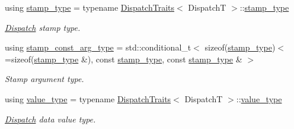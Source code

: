 \begin{DoxyCompactItemize}
\item 
\mbox{\label{classflow_1_1_dispatch_queue_a7908f3d78b7f1767462244b94434d748}} 
using \hyperlink{classflow_1_1_dispatch_queue_a7908f3d78b7f1767462244b94434d748}{stamp\+\_\+type} = typename \hyperlink{structflow_1_1_dispatch_traits}{Dispatch\+Traits}$<$ DispatchT $>$\+::\hyperlink{classflow_1_1_dispatch_queue_a7908f3d78b7f1767462244b94434d748}{stamp\+\_\+type}
\begin{DoxyCompactList}\small\item\em \hyperlink{classflow_1_1_dispatch}{Dispatch} stamp type. \end{DoxyCompactList}\item 
\mbox{\label{classflow_1_1_dispatch_queue_affc83531dc53ee147899a33e82a6cbf0}} 
using \hyperlink{classflow_1_1_dispatch_queue_affc83531dc53ee147899a33e82a6cbf0}{stamp\+\_\+const\+\_\+arg\+\_\+type} = std\+::conditional\+\_\+t$<$ sizeof(\hyperlink{classflow_1_1_dispatch_queue_a7908f3d78b7f1767462244b94434d748}{stamp\+\_\+type})$<$=sizeof(\hyperlink{classflow_1_1_dispatch_queue_a7908f3d78b7f1767462244b94434d748}{stamp\+\_\+type} \&), const \hyperlink{classflow_1_1_dispatch_queue_a7908f3d78b7f1767462244b94434d748}{stamp\+\_\+type}, const \hyperlink{classflow_1_1_dispatch_queue_a7908f3d78b7f1767462244b94434d748}{stamp\+\_\+type} \& $>$
\begin{DoxyCompactList}\small\item\em Stamp argument type. \end{DoxyCompactList}\item 
\mbox{\label{classflow_1_1_dispatch_queue_a2414c7db207bbc3bab885aded66cff08}} 
using \hyperlink{classflow_1_1_dispatch_queue_a2414c7db207bbc3bab885aded66cff08}{value\+\_\+type} = typename \hyperlink{structflow_1_1_dispatch_traits}{Dispatch\+Traits}$<$ DispatchT $>$\+::\hyperlink{classflow_1_1_dispatch_queue_a2414c7db207bbc3bab885aded66cff08}{value\+\_\+type}
\begin{DoxyCompactList}\small\item\em \hyperlink{classflow_1_1_dispatch}{Dispatch} data value type. \end{DoxyCompactList}\item 
\mbox{\label{classflow_1_1_dispatch_queue_afdc67058e3461410fdd6170046df55bc}} 

\end{DoxyCompactItemize}
